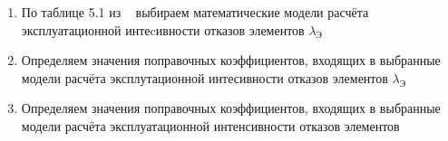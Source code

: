 \begin{enumerate}
\item По таблице 5.1 из ~\cite{Borovikov2010} выбираем математические
модели расчёта эксплуатационной интеcивности отказов элементов
$\lambda_{\text{Э}}$

\item Определяем значения поправочных коэффициентов, входящих в
выбранные модели расчёта эксплутационной интесивности отказов
элементов $\lambda_{\text{Э}}$
\item Определяем значения поправочных коэффициентов, входящих в
выбранные модели расчёта эксплуатационной интенсивности отказов
элементов
\end{enumerate}
\newpage

